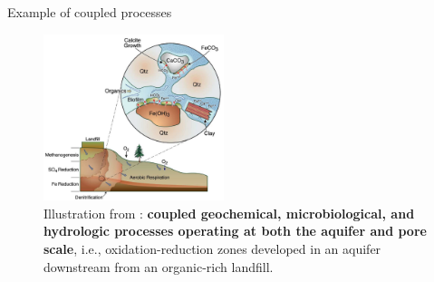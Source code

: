\begin{frame}{Example of coupled processes}
	
	\begin{figure}[!t]
		\centering
		\includegraphics[width=0.47\textwidth]{figures/reactive-transport/steefel-coupling-example.png}
		\caption{Illustration from \cite{Steefel2005}: {\bf coupled geochemical, microbiological,
			and hydrologic processes operating at both the aquifer and pore scale}, i.e., oxidation-reduction zones developed in an aquifer downstream from an organic-rich landfill.}
	\end{figure}
	
\end{frame}
%
%
